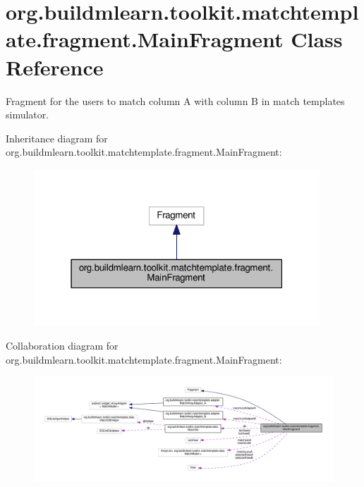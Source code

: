 \hypertarget{classorg_1_1buildmlearn_1_1toolkit_1_1matchtemplate_1_1fragment_1_1MainFragment}{}\section{org.\+buildmlearn.\+toolkit.\+matchtemplate.\+fragment.\+Main\+Fragment Class Reference}
\label{classorg_1_1buildmlearn_1_1toolkit_1_1matchtemplate_1_1fragment_1_1MainFragment}


Fragment for the users to match column A with column B in match template\textquotesingle{}s simulator.  




Inheritance diagram for org.\+buildmlearn.\+toolkit.\+matchtemplate.\+fragment.\+Main\+Fragment\+:
\nopagebreak
\begin{figure}[H]
\begin{center}
\leavevmode
\includegraphics[width=304pt]{classorg_1_1buildmlearn_1_1toolkit_1_1matchtemplate_1_1fragment_1_1MainFragment__inherit__graph}
\end{center}
\end{figure}


Collaboration diagram for org.\+buildmlearn.\+toolkit.\+matchtemplate.\+fragment.\+Main\+Fragment\+:
\nopagebreak
\begin{figure}[H]
\begin{center}
\leavevmode
\includegraphics[width=350pt]{classorg_1_1buildmlearn_1_1toolkit_1_1matchtemplate_1_1fragment_1_1MainFragment__coll__graph}
\end{center}
\end{figure}
